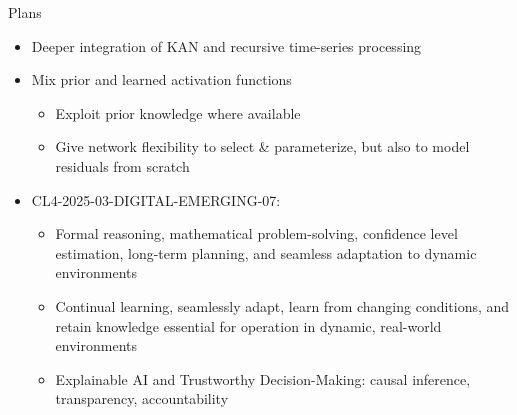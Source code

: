 



\begin{frame}{Plans}

\begin{itemize}
\item Deeper integration of KAN and recursive time-series
  processing
\item Mix prior and learned activation functions
  \begin{itemize}
  \item Exploit prior knowledge where available
  \item Give network flexibility to select \& parameterize, but also
    to model residuals from scratch
  \end{itemize}
\item CL4-2025-03-DIGITAL-EMERGING-07:
  \begin{itemize}
  \item Formal reasoning, mathematical problem-solving, confidence
    level estimation, long-term planning, and seamless adaptation to
    dynamic environments
  \item Continual learning, seamlessly adapt, learn from changing
    conditions, and retain knowledge essential for operation in
    dynamic, real-world environments
  \item Explainable AI and Trustworthy Decision-Making: causal
    inference, transparency, accountability
  \end{itemize}
\end{itemize}

\end{frame}
